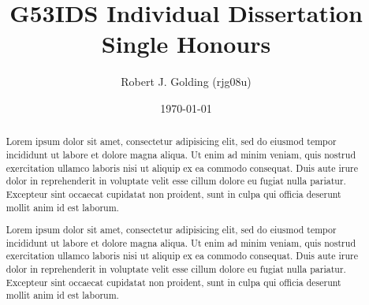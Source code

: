 \documentclass[a4paper,11pt]{article}
\title{G53IDS Individual Dissertation Single Honours}
\author{Robert J. Golding (rjg08u)} \date{\today}
\begin{document}
    \maketitle
    \thispagestyle{empty}

    \begin{abstract}

        Lorem ipsum dolor sit amet, consectetur adipisicing elit, sed do
        eiusmod tempor incididunt ut labore et dolore magna aliqua. Ut enim ad
        minim veniam, quis nostrud exercitation ullamco laboris nisi ut aliquip
        ex ea commodo consequat. Duis aute irure dolor in reprehenderit in
        voluptate velit esse cillum dolore eu fugiat nulla pariatur. Excepteur
        sint occaecat cupidatat non proident, sunt in culpa qui officia
        deserunt mollit anim id est laborum.

        Lorem ipsum dolor sit amet, consectetur adipisicing elit, sed do
        eiusmod tempor incididunt ut labore et dolore magna aliqua. Ut enim ad
        minim veniam, quis nostrud exercitation ullamco laboris nisi ut aliquip
        ex ea commodo consequat. Duis aute irure dolor in reprehenderit in
        voluptate velit esse cillum dolore eu fugiat nulla pariatur. Excepteur
        sint occaecat cupidatat non proident, sunt in culpa qui officia
        deserunt mollit anim id est laborum.

    \end{abstract}

    \newpage
    \tableofcontents
    \newpage

    

    

    \newpage
    

    \newpage
    

    \newpage
    

    \newpage
    \nocite{*}
    
    
\end{document}
